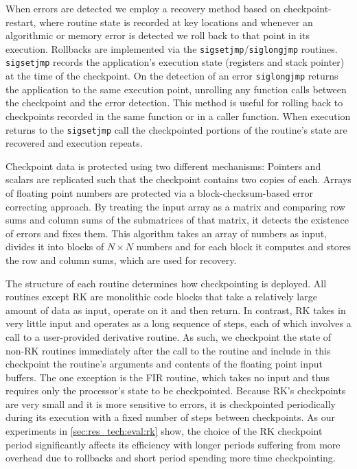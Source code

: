 \documentclass{sig-alternate}
\begin{document}
{When errors are detected we employ a recovery method based on checkpoint-restart, where routine state is recorded at key locations and whenever an algorithmic or memory error is detected we roll back to that point in its execution.
Rollbacks are implemented via the \texttt{sigsetjmp}/\texttt{siglongjmp} \cite{sigsetjmp:1997} routines.
\texttt{sigsetjmp} records the application's execution state (registers and stack pointer) at the time of the checkpoint.
On the detection of an error \texttt{siglongjmp} returns the application to the same execution point, unrolling any function calls between the checkpoint and the error detection.
This method is useful for rolling back to checkpoints recorded in the same function or in a caller function.
When execution returns to the \texttt{sigsetjmp} call the checkpointed portions of the routine's state are recovered and execution repeats.

Checkpoint data is protected using two different mechanisms:
Pointers and scalars are replicated such that the checkpoint contains two copies of each.
Arrays of floating point numbers are protected via a block-checksum-based error correcting approach.
By treating the input array as a matrix and comparing row sums and column sums of the submatrices of that matrix, it detects the existence of errors and fixes them.
This algorithm takes an array of numbers as input, divides it into blocks of $N \times N$ numbers and for each block it computes and stores the row and column sums, which are used for recovery.

The structure of each routine determines how checkpointing is deployed.
All routines except RK are monolithic code blocks that take a relatively large amount of data as input, operate on it and then return.
In contrast, RK takes in very little input and operates as a long sequence of steps, each of which involves a call to a user-provided derivative routine.
As such, we checkpoint the state of non-RK routines immediately after the call to the routine and include in this checkpoint the routine's arguments and contents of the floating point input buffers.
The one exception is the FIR routine, which takes no input and thus requires only the processor's state to be checkpointed.
Because RK's checkpoints are very small and it is more sensitive to errors, it is checkpointed periodically during its execution with a fixed number of steps between checkpoints.
As our experiments in \ref{sec:res_tech:eval:rk} show, the choice of the RK checkpoint period significantly affects its efficiency with longer periods suffering from more overhead due to rollbacks and short period spending more time checkpointing.

}
\end{document}
